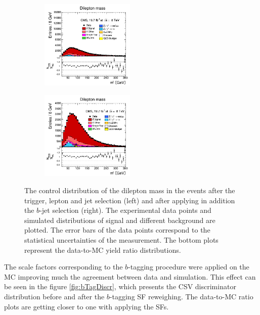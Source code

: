 \begin{itemize}
 \begin{figure}[h]
 \centering
 \begin{subfigure}
   \centering
   \includegraphics[width=0.49\textwidth]{04_event_reconstruction/plots/mll_step5.png}
 \end{subfigure}
 \begin{subfigure}
   \centering
   \includegraphics[width=0.49\textwidth]{04_event_reconstruction/plots/mll_step6.png}
 \end{subfigure}
 \caption{The control distribution of the dilepton mass in the events after the trigger, lepton and jet selection (left) and after applying in addition the $b$-jet selection (right). 
 The experimental data points and simulated distributions of signal and different background are plotted. The error bars of the data points
 correspond to the statistical uncertainties of the measurement. The bottom plots represent the data-to-MC yield ratio distributions.}
 \label{fig:mllbJetSel}
 \end{figure}
 
 The scale factors corresponding to the $b$-tagging procedure were applied on the MC improving much the agreement between data and simulation. This effect can be seen in the 
 figure \ref{fig:bTagDiscr}, which presents the CSV discriminator distribution before and after the $b$-tagging SF reweighing. The data-to-MC ratio plots are getting closer to one with
 applying the SFs.
 

\end{itemize}
